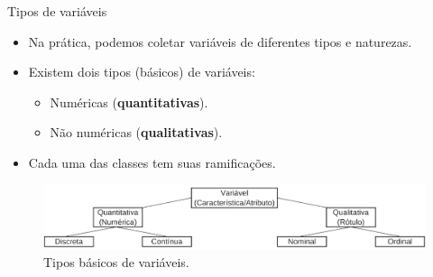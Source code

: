 \documentclass[
  ignorenonframetext,
  serif,
  professionalfont,
  usenames,
  dvipsnames,
  aspectratio = 169]{beamer}
\providecommand{\tightlist}{%
  \setlength{\itemsep}{0pt}\setlength{\parskip}{0pt}}
\renewcommand{\tightlist}{%
  \setlength{\itemsep}{0\baselineskip}
  \setlength{\parskip}{0.25\baselineskip}
}
\begin{document}
\begin{frame}{Tipos de variáveis}
\protect\hypertarget{tipos-de-variuxe1veis}{}
\begin{itemize}
\item
  Na prática, podemos coletar variáveis de diferentes tipos e naturezas.
\item
  Existem dois tipos (básicos) de variáveis:

  \begin{itemize}
  \tightlist
  \item
    Numéricas (\textbf{quantitativas}).
  \item
    Não numéricas (\textbf{qualitativas}).
  \end{itemize}
\item
  Cada uma das classes tem suas ramificações.
\end{itemize}

\begin{figure}

{\centering \includegraphics[width=0.9\linewidth]{./img/tipos-variaveis2} 

}

\caption{Tipos básicos de variáveis.}\label{fig:unnamed-chunk-5}
\end{figure}
\end{frame}
\end{document}
